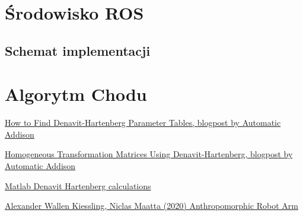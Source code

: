 \documentclass[a4paper,13pt]{article}
\begin{document}
\section{Środowisko ROS}
\subsection{Schemat implementacji}

\section{Algorytm Chodu}

\begin{thebibliography}{9}
\href{https://automaticaddison.com/how-to-find-denavit-hartenberg-parameter-tables/}{How to Find Denavit-Hartenberg Parameter Tables, blogpost by Automatic Addison}

\href{https://automaticaddison.com/homogeneous-transformation-matrices-using-denavit-hartenberg/}{Homogeneous Transformation Matrices Using Denavit-Hartenberg, blogpost by Automatic Addison}

\href{./DH_calculations.m}{Matlab Denavit Hartenberg calculations}

\bibitem{}
\href{https://www.diva-portal.org/smash/get/diva2:1462059/FULLTEXT01.pdf}{Alexander Wallen Kiessling, Niclas Maatta (2020) Anthropomorphic Robot Arm}

\end{thebibliography}
\end{document}
